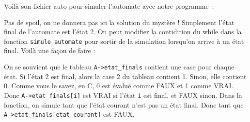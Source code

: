 \documentclass[10pt]{article}
\begin{document}
\begin{enumerate}[label=\textbf{[\alph*]}]
  Voilà son fichier auto pour simuler l'automate avec notre
  programme~:

  \lstset{style=none}
  
  \vspace{0.2cm}

\item Pas de spoil, on ne donnera pas ici la solution du mystère !
  Simplement l'état final de l'automate est l'état 2. On peut modifier
  la contidition du while dans la fonction \texttt{simule\_automate}
  pour sortir de la simulation lorsqu'on arrive à un état final. Voilà
  une façon de faire :

  \lstset{style=customc}
  
  \vspace{0.2cm}

  On se souvient que le tableau \texttt{A->etat\_finals} contient une
  case pour chaque état. Si l'état 2 est final, alors la case 2 du
  tableau contient 1. Sinon, elle contient 0. Comme vous le savez, en
  C, 0 est évalué comme FAUX et 1 comme VRAI. Donc
  \texttt{A->etat\_finals[i]} est VRAI si l'état \texttt{i} est final,
  et FAUX sinon. Dans la fonction, on simule tant que l'état courant
  n'est pas un état final. Donc tant que
  \texttt{A->etat\_finals[etat\_courant]} est FAUX.

\end{enumerate}
\end{document}
